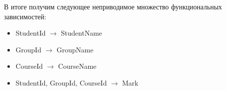 \documentclass[12pt,a4paper,oneside]{article}
\begin{document}
\begin{itemize}
\medskip

В итоге получим следующее неприводимое множество функциональных зависимостей:

\begin{itemize}

\item StudentId $\rightarrow$ StudentName

\item GroupId $\rightarrow$ GroupName

\item CourseId $\rightarrow$ CourseName

\item StudentId, GroupId, CourseId $\rightarrow$ Mark

\end{itemize}

\end{itemize}
\end{document}
